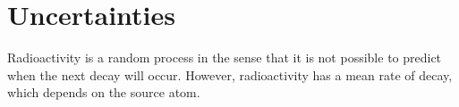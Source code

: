 \section{Uncertainties}

Radioactivity is a random process in the sense that it is not possible to predict when the next decay will occur. However, radioactivity has a mean rate of decay, which depends on the source atom.
